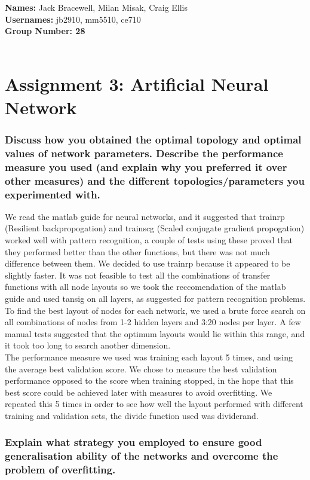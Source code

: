 \documentclass[12pt]{article}
\begin{document}
{\bf Names:} Jack Bracewell, Milan Misak, Craig Ellis \\
{\bf Usernames:} jb2910, mm5510, ce710 \\
{\bf Group Number: 28}  \\ \\

\section*{Assignment 3: Artificial Neural Network}

\subsubsection*{Discuss how you obtained the optimal topology and optimal values of network parameters. Describe the performance measure you used (and explain why you preferred it over other measures) and the different topologies/parameters you experimented with.}

We read the matlab guide for neural networks, and it suggested that trainrp (Resilient backpropogation) and trainscg (Scaled conjugate gradient propogation) worked well with pattern recognition, a couple of tests using these proved that they performed better than the other functions, but there was not much difference between them. We decided to use trainrp because it appeared to be slightly faster. It was not feasible to test all the combinations of transfer functions with all node layouts so we took the reccomendation of the matlab guide and used tansig on all layers, as suggested for pattern recognition problems. To find the best layout of nodes for each network, we used a brute force search on all combinations of nodes from 1-2 hidden layers and 3:20 nodes per layer. A few manual tests suggested that the optimum layouts would lie within this range, and it took too long to search another dimension.\\
The performance measure we used was training each layout 5 times, and using the average best validation score. We chose to measure the best validation performance opposed to the score when training stopped, in the hope that this best score could be achieved later with measures to avoid overfitting. We repeated this 5 times in order to see how well the layout performed with different training and validation sets, the divide function used was dividerand.


\subsubsection*{Explain what strategy you employed to ensure good generalisation ability of the networks and overcome the problem of overfitting.}
\end{document}
